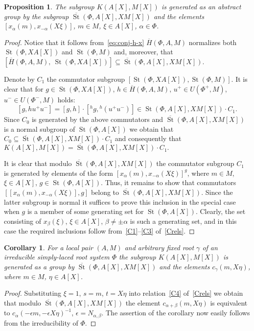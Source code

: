 \documentclass[oneside, 8pt]{amsart}
\newtheorem{prop}[lemma]{Proposition}
\newtheorem{corollary}[lemma]{Corollary}
\theoremstyle{remark}
\theoremstyle{definition}
\numberwithin{lemma}{section}
\numberwithin{prop}{section}
\numberwithin{corollary}{section}
\DeclareMathOperator{\St}{St}
\numberwithin{equation}{section}
\begin{document}
\begin{prop} \label{Kgen} The subgroup $K(A[X], M[X])$ is generated as an abstract group by the subgroup $\overline{\St}(\Phi, A[X], XM[X])$ and
 the elements $[x_\alpha(m), x_{-\alpha}(X\xi)]$, $m \in M$, $\xi \in A[X]$, $\alpha \in \Phi$. \end{prop}
\begin{proof} Notice that it follows from~\eqref{eq:conj-h-x} $\overline{H}(\Phi, A, M)$ normalizes both $\St(\Phi, XA[X])$ and $\St(\Phi, M)$ and, moreover, that $[\overline{H}(\Phi, A, M),\ \St(\Phi, XA[X])] \subseteq \overline{\St}(\Phi, A[X], XM[X])$. 

Denote by $C_1$ the commutator subgroup $[\St(\Phi, XA[X]), \St(\Phi, M)]$.
It is clear that for $g \in \St(\Phi, XA[X])$, $h \in \overline{H}(\Phi, A, M)$, $u^+ \in U(\Phi^+, M)$, $u^- \in U(\Phi^-, M)$ holds:
\[ [g, h u^+ u^-] = [g, h] \cdot [{}^{h}\!g, {}^{h}\!(u^+u^-)] \in \St(\Phi, A[X], XM[X]) \cdot C_1.\]
Since $C_0$ is generated by the above commutators and $\overline{\St}(\Phi, A[X], XM[X])$ is a normal subgroup of $\St(\Phi, A[X])$
we obtain that $C_0 \subseteq \overline{\St}(\Phi, A[X], XM[X]) \cdot C_1$ and consequently that
$K(A[X], M[X]) = \overline{\St}(\Phi, A[X], XM[X]) \cdot C_1.$
 
It is clear that modulo $\overline{\St}(\Phi, A[X], XM[X])$ the commutator subgroup $C_1$ is generated by elements of the form $[x_\alpha(m), x_{-\alpha}(X\xi)]^g$, where $m \in M$, $\xi \in A[X]$, $g \in \St(\Phi, A[X])$.
Thus, it remains to show that commutators $[[x_\alpha(m), x_{-\alpha}(X\xi)], g]$ belong to $\overline{\St}(\Phi, A[X], XM[X])$.
Since the latter subgroup is normal it suffices to prove this inclusion in the special case when $g$ is a member of some generating set for $\St(\Phi, A[X])$.
Clearly, the set consisting of $x_\beta(\xi)$, $\xi \in A[X]$, $\beta \neq \pm \alpha$ is such a generating set, 
 and in this case the required inclusions follow from~\eqref{C1}--\eqref{C3} of~\cref{Crels}. \end{proof}

\begin{corollary} \label{Kgen-strong} For a local pair $(A, M)$ and arbitrary fixed root $\gamma$ of an irreducible simply-laced root system $\Phi$ the subgroup $K(A[X], M[X])$ is generated as a group by $\overline{\St}(\Phi, A[X], XM[X])$ and the elements $c_{\gamma}(m, X\eta)$, where $m \in M$, $\eta \in A[X]$. \end{corollary}
\begin{proof} Substituting $\xi = 1$, $s = m$, $t = X\eta$ into relation~\eqref{C4} of~\cref{Crels} we obtain that modulo 
 $\overline{\St}(\Phi, A[X], XM[X])$ the element $c_{\alpha + \beta}(m, X\eta)$ is equivalent to $c_{\alpha}(-\epsilon m, -\epsilon X \eta)^{-1}$, $\epsilon = N_{\alpha, \beta}$. The assertion of the corollary now easily follows from the irreducibility of $\Phi$.
\end{proof}
\end{document}
